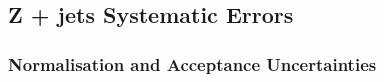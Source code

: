
\subsection{Z + jets Systematic Errors}
\label{sec:zjets-systs}


\subsubsection{Normalisation and Acceptance Uncertainties}




